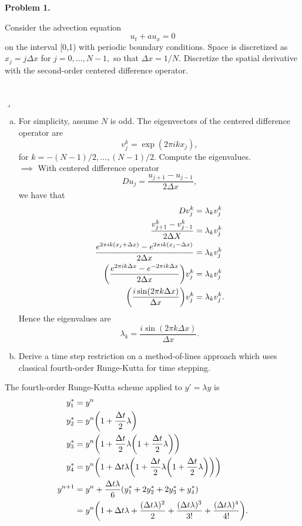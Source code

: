\documentclass[12pt]{article}
\newenvironment{myprob}[1]
    {%
    \noindent{\Huge$\ulcorner$}\textbf{#1.}\begin{em}
    }
    { 
    \end{em} \\ \hphantom{l} \hfill {\Huge$\lrcorner$} }
\begin{document}
\rhead{\today}

{\let\newpage\relax} 


\begin{myprob}{Problem 1}
Consider the advection equation
$$u_t + au_x = 0 $$
on the interval [0,1) with periodic boundary conditions. Space is discretized as $x_j = j \Delta x$ for $j=0, \dots, N-1,$ so that $\Delta x = 1/N$.  Discretize the spatial derivative with the second-order centered difference operator.
\end{myprob}
\begin{enumerate}[(a)]
\item For simplicity, assume $N$ is odd.  The eigenvectors of the centered difference operator are 
$$v_j^k = \exp(2\pi i k x_j),$$
for $k=-(N-1)/2, \dots, (N-1)/2$.  Compute the eigenvalues. \\

$\implies$ With centered difference operator
  $$D u_j = \dfrac{u_{j+1} - u_{j-1}}{2\Delta x},$$
  we have that 
  \begin{align*}
  D v_j^k &= \lambda_k v_j^k \\
  \dfrac{v^k_{j+1}- v^k_{j-1}}{2\Delta X} &= \lambda_k v_j^k\\
  \dfrac{e^{2\pi i k (x_j+\Delta x)}- e^{2 \pi i k (x_j - \Delta x)}}{2\Delta x} &= \lambda_k v_j^k \\
 \qty( \dfrac{e^{2\pi i k \Delta x}- e^{-2 \pi i k \Delta x}}{2\Delta x }) v_j^k &= \lambda_k v_j^k \\
 \qty(\dfrac{i \sin(2\pi k \Delta x)}{\Delta x})v_j^k &= \lambda_k v_j^k.
  \end{align*}
 Hence the eigenvalues are $$\lambda_k = \dfrac{i \sin(2 \pi k \Delta x)}{\Delta x}.$$

\item Derive a time step restriction on a method-of-lines approach which uses classical fourth-order Runge-Kutta for time stepping.
\end{enumerate}
The fourth-order Runge-Kutta scheme applied to $y' = \lambda y$ is
\begin{align*}
y_1^* &= y^n \\
y_2^* &= y^n\qty(1 + \dfrac{\Delta t}{2} \lambda) \\
y_3^* &= y^n\qty(1 + \dfrac{\Delta t}{2} \lambda\qty(1 + \dfrac{\Delta t}{2} \lambda)) \\
y_4^* &= y^n\qty(1 + \Delta t \lambda\qty(1 + \dfrac{\Delta t}{2} \lambda\qty(1 + \dfrac{\Delta t}{2} \lambda))) \\
y^{n+1} &= y^n + \dfrac{\Delta t \lambda}{6}\qty(y_1^* + 2y_2^* +2y_3^*+y_4^*)\\
&= y^n\qty(1 + \Delta t \lambda + \dfrac{(\Delta t\lambda)^2}{2}+\dfrac{(\Delta t\lambda)^3}{3!}+\dfrac{(\Delta t\lambda)^4}{4!}).
\end{align*}
\end{document}
